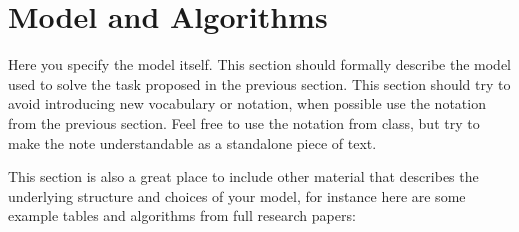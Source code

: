 \documentclass[11pt]{article}
\begin{document}



\section{Model and Algorithms}

Here you specify the model itself. This section should formally
describe the model used to solve the task proposed in the previous
section. This section should try to avoid introducing new vocabulary
or notation, when possible use the notation from the previous section.
Feel free to use the notation from class, but try to make the note
understandable as a standalone piece of text.

This section is also a great place to include other material that
describes the underlying structure and choices of your model, for
instance here are some example tables and algorithms from full
research papers:
\end{document}
